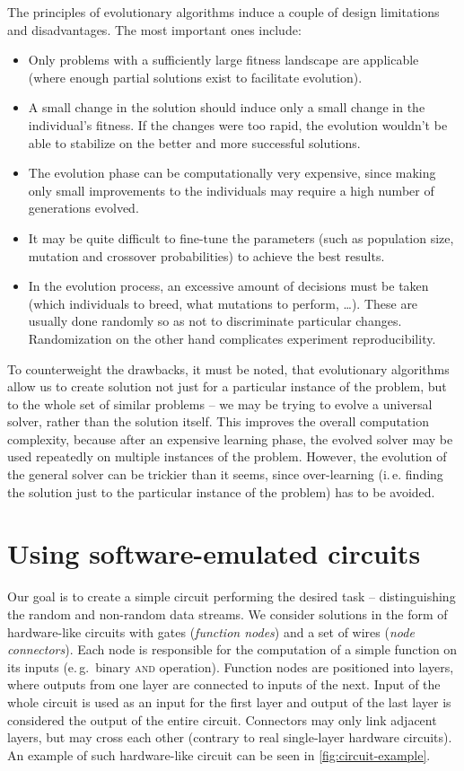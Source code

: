 \documentclass[12pt,twoside]{fithesis2}		%
\renewcommand{\_}{\leavevmode \kern0.0em\vbox{\hrule width0.4em}}
\newcommand{\squarebullet}{\textcolor{black}{\raisebox{0.15em}{\rule{4pt}{4pt}}}}
\newenvironment{myItemize}{
  \begin{itemize}[leftmargin=2em,rightmargin=1em,itemsep=\parskip ,parsep=0em,topsep=0em,partopsep=0em]
  \renewcommand{\labelitemi}{\squarebullet}
  \renewcommand{\labelitemii}{$\diamond$}
}{
  \end{itemize}
}
\begin{document}
\noindent
The principles of evolutionary algorithms induce a couple of design limitations and disadvantages. 
The most important ones include:
\begin{myItemize}
\item Only problems with a sufficiently large fitness landscape are applicable (where enough partial solutions exist to facilitate
evolution).
\item A small change in the solution should induce only a small change in the individual's fitness. If the changes were
too rapid, the evolution wouldn't be able to stabilize on the better and more successful solutions.
\item The evolution phase can be computationally very expensive, since making only small improvements to the individuals may require
a high number of generations evolved.
\item It may be quite difficult to fine-tune the parameters (such as population size, mutation and crossover probabilities)
to achieve the best results.
\item In the evolution process, an excessive amount of decisions must be taken (which individuals to breed, 
what mutations to perform, \dots). These are usually done randomly so as not to discriminate particular changes.
Randomization on the other hand complicates experiment reproducibility.
\end{myItemize}

\noindent
To counterweight the drawbacks, it must be noted, that evolutionary algorithms allow us to create solution not just for a particular
instance of the problem, but to the whole set of similar problems -- we may be trying to evolve a universal solver, 
rather than the solution itself. 
This improves the overall computation complexity, because after an expensive learning phase, the evolved solver may be used
repeatedly on multiple instances of the problem. However, the evolution of the general solver can be trickier than it seems,
since over-learning (i.\,e. finding the solution just to the particular instance of the problem) has to be avoided.

\section{Using software-emulated circuits}
\label{sec:sw-circuits}

Our goal is to create a simple circuit performing the desired task -- distinguishing the random and non-random data streams.
We consider solutions in the form of hardware-like circuits with gates (\textit{function nodes}) 
and a set of wires (\textit{node connectors}).
Each node is responsible for the computation of a simple function on its inputs (e.\,g.\ binary \textsc{and} operation).
Function nodes are positioned into layers, where outputs from one layer are connected to inputs of the next. Input of the whole
circuit is used as an input for the first layer and output of the last layer is considered the output of the entire circuit.
Connectors may only link adjacent layers, but may cross each other (contrary to real single-layer hardware circuits).
An example of such hardware-like circuit can be seen in \autoref{fig:circuit-example}.
\end{document}
